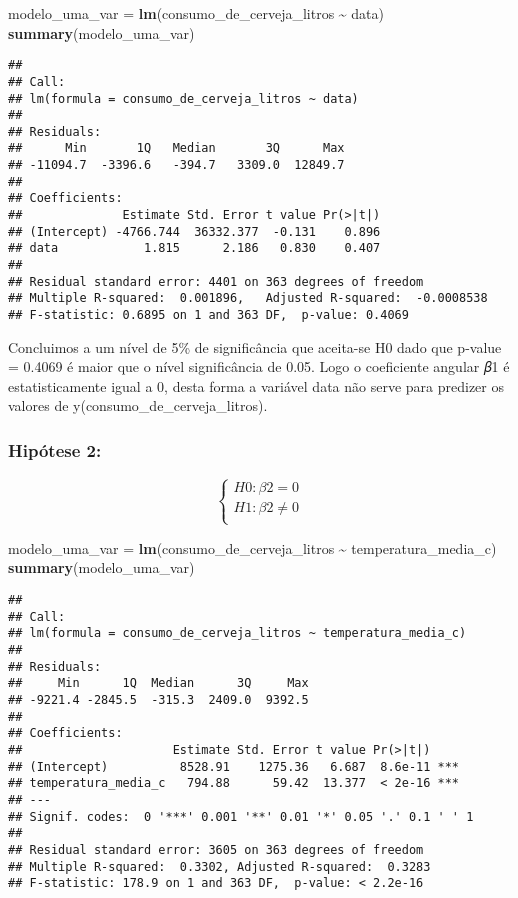 \documentclass[
]{article}
\newenvironment{Shaded}{\begin{snugshade}}{\end{snugshade}}
\newcommand{\FunctionTok}[1]{\textcolor[rgb]{0.13,0.29,0.53}{\textbf{#1}}}
\newcommand{\NormalTok}[1]{#1}
\newcommand{\OtherTok}[1]{\textcolor[rgb]{0.56,0.35,0.01}{#1}}
\newcommand{\SpecialCharTok}[1]{\textcolor[rgb]{0.81,0.36,0.00}{\textbf{#1}}}
\begin{document}
\begin{Shaded}
\begin{Highlighting}[]
\NormalTok{modelo\_uma\_var }\OtherTok{=} \FunctionTok{lm}\NormalTok{(consumo\_de\_cerveja\_litros }\SpecialCharTok{\textasciitilde{}}\NormalTok{ data)}
\FunctionTok{summary}\NormalTok{(modelo\_uma\_var)}
\end{Highlighting}
\end{Shaded}

\begin{verbatim}
## 
## Call:
## lm(formula = consumo_de_cerveja_litros ~ data)
## 
## Residuals:
##      Min       1Q   Median       3Q      Max 
## -11094.7  -3396.6   -394.7   3309.0  12849.7 
## 
## Coefficients:
##              Estimate Std. Error t value Pr(>|t|)
## (Intercept) -4766.744  36332.377  -0.131    0.896
## data            1.815      2.186   0.830    0.407
## 
## Residual standard error: 4401 on 363 degrees of freedom
## Multiple R-squared:  0.001896,   Adjusted R-squared:  -0.0008538 
## F-statistic: 0.6895 on 1 and 363 DF,  p-value: 0.4069
\end{verbatim}

Concluimos a um nível de 5\% de significância que aceita-se H0 dado que
p-value = 0.4069 é maior que o nível significância de 0.05. Logo o
coeficiente angular 𝛽1 é estatisticamente igual a 0, desta forma a
variável data não serve para predizer os valores de
y(consumo\_de\_cerveja\_litros).

\hypertarget{hipuxf3tese-2}{%
\subsubsection{Hipótese 2:}\label{hipuxf3tese-2}}

\[
\left\{ \begin{array}{rc} 
H0: \beta2 = 0 \\ 
H1: \beta2 \neq 0 \\ 
\end{array}\right.
\]

\begin{Shaded}
\begin{Highlighting}[]
\NormalTok{modelo\_uma\_var }\OtherTok{=} \FunctionTok{lm}\NormalTok{(consumo\_de\_cerveja\_litros }\SpecialCharTok{\textasciitilde{}}\NormalTok{ temperatura\_media\_c)}
\FunctionTok{summary}\NormalTok{(modelo\_uma\_var)}
\end{Highlighting}
\end{Shaded}

\begin{verbatim}
## 
## Call:
## lm(formula = consumo_de_cerveja_litros ~ temperatura_media_c)
## 
## Residuals:
##     Min      1Q  Median      3Q     Max 
## -9221.4 -2845.5  -315.3  2409.0  9392.5 
## 
## Coefficients:
##                     Estimate Std. Error t value Pr(>|t|)    
## (Intercept)          8528.91    1275.36   6.687  8.6e-11 ***
## temperatura_media_c   794.88      59.42  13.377  < 2e-16 ***
## ---
## Signif. codes:  0 '***' 0.001 '**' 0.01 '*' 0.05 '.' 0.1 ' ' 1
## 
## Residual standard error: 3605 on 363 degrees of freedom
## Multiple R-squared:  0.3302, Adjusted R-squared:  0.3283 
## F-statistic: 178.9 on 1 and 363 DF,  p-value: < 2.2e-16
\end{verbatim}
\end{document}
